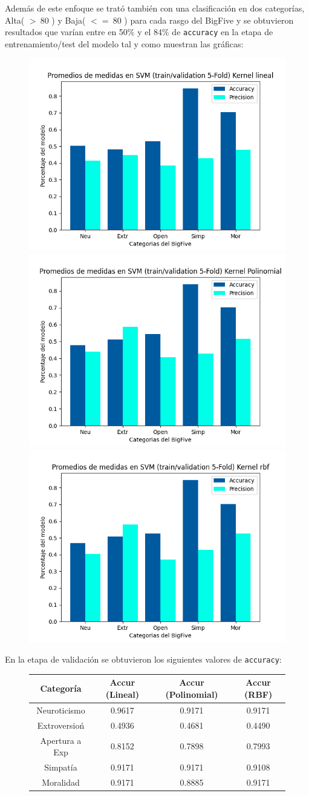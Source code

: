 \documentclass[10pt, a4paper]{article}
\begin{document}
            Adem\'as de este enfoque se trat\'o tambi\'en con una clasificaci\'on en dos categor\'ias, Alta( $>~ 80$ ) y Baja( $<= ~80$ ) para
            cada rasgo del BigFive y se obtuvieron resultados que var\'ian entre en 50\% y el 84\% de \texttt{accuracy} en la etapa 
            de entrenamiento/test del modelo tal y como muestran las gr\'aficas:\\ 

            \begin{figure}[H]
                \centering
                \includegraphics[width = 0.3\linewidth]{Medias_Lineal.png}
                \includegraphics[width = 0.3\linewidth]{Medias_Polinomial.png}
                \includegraphics[width = 0.3\linewidth]{Medias_rbf.png}

            \end{figure}

            En la etapa de validaci\'on se obtuvieron los siguientes valores de \texttt{accuracy}: \\ 
            

            \begin{figure}[H]
                \centering
                \begin{tabular}{|c|c|c|c|}

                    \hline Categor\'ia & Accur (Lineal) & Accur (Polinomial) & Accur (RBF) \\  
                    \hline Neuroticismo             & 0.9617 & 0.9171  &  0.9171\\
                    \hline Extroversio\'n           & 0.4936 & 0.4681  &  0.4490\\
                    \hline Apertura a Exp           & 0.8152 & 0.7898  &  0.7993\\
                    \hline Simpat\'ia               & 0.9171 & 0.9171  &  0.9108\\
                    \hline Moralidad                & 0.9171 & 0.8885  &  0.9171\\
                    \hline
                \end{tabular}
            \end{figure}
            
\end{document}
